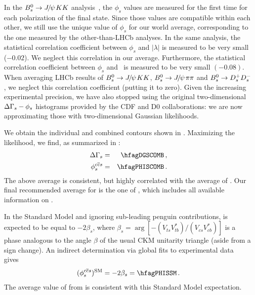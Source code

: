 In  the  $B^0_s \to {J\mskip -3mu/\mskip -2mu\psi\mskip 2mu} KK$ analysis~\cite{LHCB-PAPER-2014-059,*Aaij:2013oba_supersede2}, the $\phi_s$ values are measured for the first time for each polarization of the final state. Since those values are compatible within each other, we still use the unique value of $\phi_s$ for our world average, corresponding to the one measured by the other-than-LHCb analyses. 
In the same analysis, the statistical correlation coefficient between $\phi_s$ and $|\lambda|$ is measured to be very small ($-0.02$). We neglect this correlation in our average. 
Furthermore, the statistical correlation coefficient between $\phi_s$ and \DGs\ is measured to be very small $(-0.08)$. When averaging LHCb results of 
$B^0_s \to {J\mskip -3mu/\mskip -2mu\psi\mskip 2mu} KK$,  $B^0_s \to {J\mskip -3mu/\mskip -2mu\psi\mskip 2mu} \pi\pi$ and $B^0_s \to D_s^+ D_s^-$, we neglect this correlation coefficient (putting it to zero). 
Given the increasing experimental precision, we have also stopped using the original two-dimensional $\Delta\Gamma_{s}-\phi_s$ histograms provided by the CDF and D0 collaborations: we are now approximating those with two-dimensional Gaussian likelihoods. 

We obtain the individual and combined contours shown in . %
Maximizing the likelihood, we find, as summarized in :  
\begin{eqnarray}
\DGs &=& \hfagDGSCOMB \,, \\    
\phiccbars &=& \hfagPHISCOMB \,.
\labe{phis}
\end{eqnarray}
The above \DGs average is consistent, but highly correlated with the average
of . Our
final recommended average for \DGs is the one of , which 
includes all available information on \DGs. 

In the Standard Model and ignoring sub-leading penguin contributions, 
\phiccbars is expected to be equal to $-2\beta_s$, 
where
$\beta_s = \arg\left[-\left(V_{ts}V^*_{tb}\right)/\left(V_{cs}V^*_{cb}\right)\right]$ %
is a phase analogous to the angle $\beta$ of the usual CKM
unitarity triangle (aside from a sign change). %
An indirect determination via global fits to experimental data
gives~\cite{Charles:2011va_mod}
\begin{equation}
(\phiccbars)^{\rm SM} = -2\beta_s = \hfagPHISSM \,.
\labe{phisSM}
\end{equation}
The average value of \phiccbars from  is consistent with this
Standard Model expectation.

